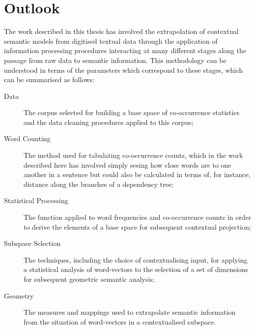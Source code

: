 \section{Outlook}
The work described in this thesis has involved the extrapolation of contextual semantic models from digitised textual data through the application of information processing procedures interacting at many different stages along the passage from raw data to semantic information.  This methodology can be understood in terms of the parameters which correspond to these stages, which can be summarised as follows:

\begin{description}
\item[Data] The corpus selected for building a base space of co-occurrence statistics and the data cleaning procedures applied to this corpus;

\item[Word Counting] The method used for tabulating co-occurrence counts, which in the work described here has involved simply seeing how close words are to one another in a sentence but could also be calculated in terms of, for instance, distance along the branches of a dependency tree;

\item[Statistical Processing] The function applied to word frequencies and co-occurrence counts in order to derive the elements of a base space for subsequent contextual projection;

\item[Subspace Selection] The techniques, including the choice of contextualising input, for applying a statistical analysis of word-vectors to the selection of a set of dimensions for subsequent geometric semantic analysis;

\item[Geometry] The measures and mappings used to extrapolate semantic information from the situation of word-vectors in a contextualised subspace.
\end{description}

